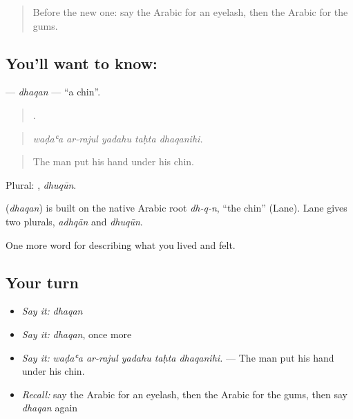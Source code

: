 \label{lesson:AR-C506-dhaqn}



\begin{quote}
Before the new one: say the Arabic for an eyelash, then the Arabic for the gums.
\end{quote}

\subsection*{You'll want to know: }
\textbf{} — \emph{dhaqan} — \textquotedblleft{}a chin\textquotedblright{}.

\begin{quote}
    .
\end{quote}

\begin{quote}
\emph{waḍaʿa ar-rajul yadahu taḥta dhaqanihi.}
\end{quote}

\begin{quote}
The man put his hand under his chin.
\end{quote}

Plural: , \emph{dhuqūn}.

\begin{cousinweb}
\textbf{} (\emph{dhaqan}) is built on the native Arabic root \emph{dh-q-n}, \textquotedblleft{}the chin\textquotedblright{} (Lane). Lane gives two plurals, \emph{adhqān} and \emph{dhuqūn}.
\end{cousinweb}

\begin{grammarlens}[title={What you've built}]
One more word for describing what you lived and felt.
\end{grammarlens}

\subsection*{Your turn}
\begin{itemize}
\raggedright
  \item \emph{Say it:} \emph{dhaqan}
  \item \emph{Say it:} \emph{dhaqan}, once more
  \item \emph{Say it:} \emph{waḍaʿa ar-rajul yadahu taḥta dhaqanihi.} — The man put his hand under his chin.
  \item \emph{Recall:} say the Arabic for an eyelash, then the Arabic for the gums, then say \emph{dhaqan} again
\end{itemize}

